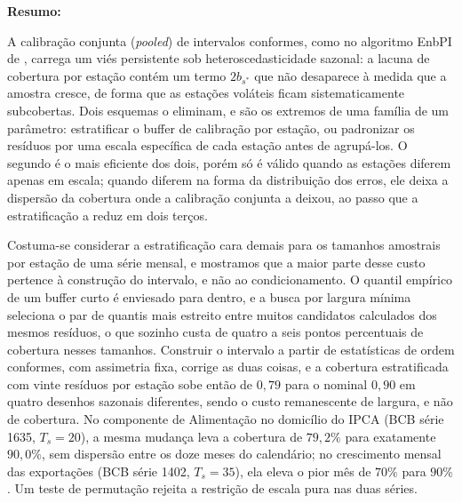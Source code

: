 \noindent\textbf{Resumo:}
\begin{otherlanguage}{brazilian}%
A calibração conjunta (\emph{pooled}) de intervalos conformes, como no
algoritmo EnbPI de \citet{xu2023conformal}, carrega um viés persistente
sob heteroscedasticidade sazonal: a lacuna de cobertura por estação
contém um termo $2b_{s^*}$ que não desaparece à medida que a amostra
cresce, de forma que as estações voláteis ficam sistematicamente
subcobertas.  Dois esquemas o eliminam, e são os extremos de uma
família de um parâmetro: estratificar o buffer de calibração por
estação, ou padronizar os resíduos por uma escala específica de cada
estação antes de agrupá-los.  O segundo é o mais eficiente dos dois,
porém só é válido quando as estações diferem apenas em escala; quando
diferem na forma da distribuição dos erros, ele deixa a dispersão da
cobertura onde a calibração conjunta a deixou, ao passo que a
estratificação a reduz em dois terços.

Costuma-se considerar a estratificação cara demais para os tamanhos
amostrais por estação de uma série mensal, e mostramos que a maior
parte desse custo pertence à construção do intervalo, e não ao
condicionamento.  O quantil empírico de um buffer curto é enviesado
para dentro, e a busca por largura mínima seleciona o par de quantis
mais estreito entre muitos candidatos calculados dos mesmos resíduos, o
que sozinho custa de quatro a seis pontos percentuais de cobertura
nesses tamanhos.  Construir o intervalo a partir de estatísticas de
ordem conformes, com assimetria fixa, corrige as duas coisas, e a
cobertura estratificada com vinte resíduos por estação sobe então de
$0{,}79$ para o nominal $0{,}90$ em quatro desenhos sazonais
diferentes, sendo o custo remanescente de largura, e não de cobertura.
No componente de Alimentação no domicílio do IPCA (BCB série 1635,
$T_s = 20$), a mesma mudança leva a cobertura de $79{,}2\%$ para
exatamente $90{,}0\%$, sem dispersão entre os doze meses do calendário;
no crescimento mensal das exportações (BCB série 1402, $T_s = 35$), ela
eleva o pior mês de $70\%$ para $90\%$.  Um teste de permutação rejeita
a restrição de escala pura nas duas séries.
\end{otherlanguage}
